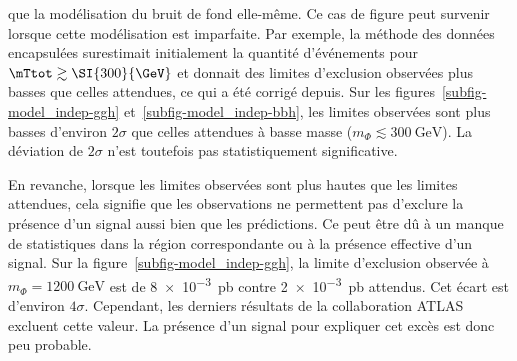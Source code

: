 que la modélisation du bruit de fond elle-même.
Ce cas de figure peut survenir lorsque cette modélisation est imparfaite.
Par exemple, la méthode des données encapsulées surestimait initialement la quantité d'événements
pour $\mTtot \gtrsim \SI{300}{\GeV}$ \cite{Gael_thesis} et donnait des limites d'exclusion observées plus basses que celles attendues, ce qui a été corrigé depuis.
Sur les figures~\ref{subfig-model_indep-ggh} et~\ref{subfig-model_indep-bbh},
les limites observées sont plus basses d'environ $2\sigma$ que celles attendues à basse masse ($m_\Phi \lesssim \SI{300}{\GeV}$).
La déviation de $2\sigma$ n'est toutefois pas statistiquement significative.
\par
En revanche, lorsque les limites observées sont plus hautes que les limites attendues,
cela signifie que les observations ne permettent pas d'exclure la présence d'un signal
aussi bien que les prédictions.
Ce peut être dû à un manque de statistiques dans la région correspondante
ou
à la présence effective d'un signal.
Sur la figure~\ref{subfig-model_indep-ggh},
la limite d'exclusion observée à $m_{\Phi}=\SI{1200}{\GeV}$ est de
\SI{8e-3}{\pico\barn}
contre
\SI{2e-3}{\pico\barn} attendus.
Cet écart est d'environ $4\sigma$.
Cependant, les derniers résultats de la collaboration ATLAS~\cite{ATLAS-MSSM-HTT_2020} excluent cette valeur.
La présence d'un signal pour expliquer cet excès est donc peu probable.
